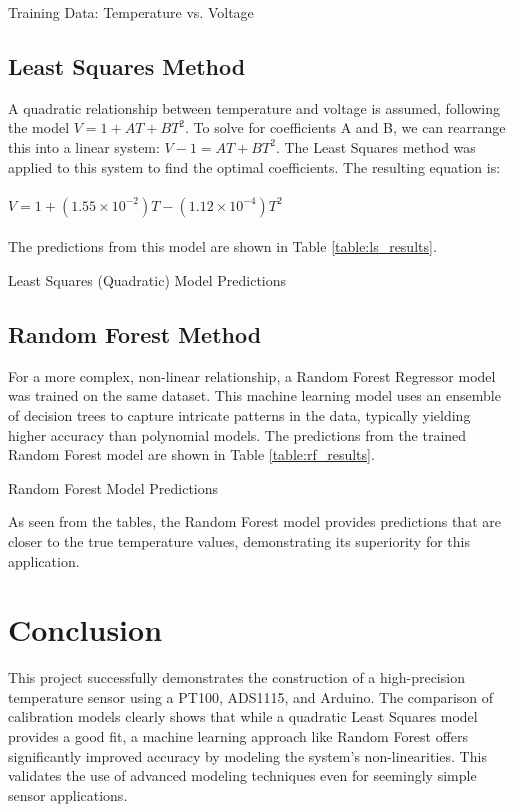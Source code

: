 \documentclass[conference]{IEEEtran}
\begin{document}
\begin{table}[!h]
  \centering
  \caption{Training Data: Temperature vs. Voltage}
  \label{table:training_data}
  
\end{table}

\subsection{Least Squares Method}
A quadratic relationship between temperature and voltage is assumed, following the model $V = 1 + AT + BT^2$. To solve for coefficients A and B, we can rearrange this into a linear system: $V - 1 = AT + BT^2$. The Least Squares method was applied to this system to find the optimal coefficients. The resulting equation is:
\\
\\
$V = 1 + (1.55 \times 10^{-2})T - (1.12 \times 10^{-4})T^2$
\\
\\
The predictions from this model are shown in Table \ref{table:ls_results}.

\begin{table}[!h]
  \centering
  \caption{Least Squares (Quadratic) Model Predictions}
  \label{table:ls_results}
  
\end{table}

\subsection{Random Forest Method}
For a more complex, non-linear relationship, a Random Forest Regressor model was trained on the same dataset. This machine learning model uses an ensemble of decision trees to capture intricate patterns in the data, typically yielding higher accuracy than polynomial models. The predictions from the trained Random Forest model are shown in Table \ref{table:rf_results}.

\begin{table}[!h]
  \centering
  \caption{Random Forest Model Predictions}
  \label{table:rf_results}
  
\end{table}

As seen from the tables, the Random Forest model provides predictions that are closer to the true temperature values, demonstrating its superiority for this application.

\section{Conclusion}
This project successfully demonstrates the construction of a high-precision temperature sensor using a PT100, ADS1115, and Arduino. The comparison of calibration models clearly shows that while a quadratic Least Squares model provides a good fit, a machine learning approach like Random Forest offers significantly improved accuracy by modeling the system's non-linearities. This validates the use of advanced modeling techniques even for seemingly simple sensor applications.

%
\end{document}
